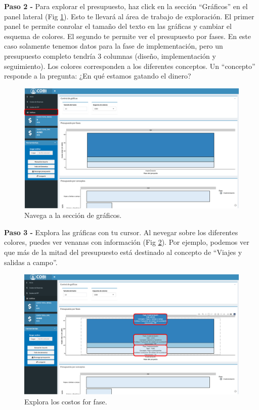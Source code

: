 \documentclass[
]{book}
\begin{document}
\textbf{Paso 2 - } Para explorar el presupuesto, haz click en la sección ``Gráficos'' en el panel lateral (Fig \ref{fig:exp-2}). Esto te llevará al área de trabajo de exploración. El primer panel te permite conrolar el tamaño del texto en las gráficas y cambiar el esquema de colores. El segundo te permite ver el presupuesto por fases. En este caso solamente tenemos datos para la fase de implementación, pero un presupuesto completo tendría 3 columnas (diseño, implementación y seguimiento). Los colores corresponden a los diferentes conceptos. Un ``concepto'' responde a la pregunta: ¿En qué estamos gatando el dinero?

\begin{figure}
\centering
\includegraphics{images/exp-2.png}
\caption{\label{fig:exp-2}Navega a la sección de gráficos.}
\end{figure}

\textbf{Paso 3 - } Explora las gráficas con tu cursor. Al nevegar sobre los diferentes colores, puedes ver venanas con información (Fig \ref{fig:exp-3}). Por ejemplo, podemos ver que más de la mitad del presupuesto está destinado al concepto de ``Viajes y salidas a campo''.

\begin{figure}
\centering
\includegraphics{images/exp-3.png}
\caption{\label{fig:exp-3}Explora los costos for fase.}
\end{figure}
\end{document}
